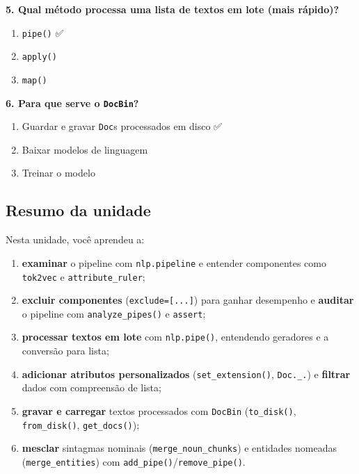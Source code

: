 \documentclass[
  brazilian,
  11pt,
]{article}
\providecommand{\tightlist}{%
  \setlength{\itemsep}{0pt}\setlength{\parskip}{0pt}}
\let\oldtexttt\texttt
\renewcommand{\texttt}[1]{{\color{inlink}\oldtexttt{#1}}}
\begin{document}
\textbf{5. Qual método processa uma lista de textos em lote (mais
rápido)?}

\begin{enumerate}
\def\labelenumi{\arabic{enumi}.}
\tightlist
\item
  \texttt{pipe()} ✅
\item
  \texttt{apply()}
\item
  \texttt{map()}
\end{enumerate}

\textbf{6. Para que serve o \texttt{DocBin}?}

\begin{enumerate}
\def\labelenumi{\arabic{enumi}.}
\tightlist
\item
  Guardar e gravar \texttt{Doc}s processados em disco ✅
\item
  Baixar modelos de linguagem
\item
  Treinar o modelo
\end{enumerate}

\subsection{Resumo da unidade}\label{resumo-da-unidade}

Nesta unidade, você aprendeu a:

\begin{enumerate}
\def\labelenumi{\arabic{enumi}.}
\tightlist
\item
  \textbf{examinar} o pipeline com \texttt{nlp.pipeline} e entender
  componentes como \texttt{tok2vec} e \texttt{attribute\_ruler};
\item
  \textbf{excluir componentes} (\texttt{exclude={[}...{]}}) para ganhar
  desempenho e \textbf{auditar} o pipeline com \texttt{analyze\_pipes()}
  e \texttt{assert};
\item
  \textbf{processar textos em lote} com \texttt{nlp.pipe()}, entendendo
  geradores e a conversão para lista;
\item
  \textbf{adicionar atributos personalizados}
  (\texttt{set\_extension()}, \texttt{Doc.\_.}) e \textbf{filtrar} dados
  com compreensão de lista;
\item
  \textbf{gravar e carregar} textos processados com \texttt{DocBin}
  (\texttt{to\_disk()}, \texttt{from\_disk()}, \texttt{get\_docs()});
\item
  \textbf{mesclar} sintagmas nominais (\texttt{merge\_noun\_chunks}) e
  entidades nomeadas (\texttt{merge\_entities}) com
  \texttt{add\_pipe()}/\texttt{remove\_pipe()}.
\end{enumerate}
\end{document}
